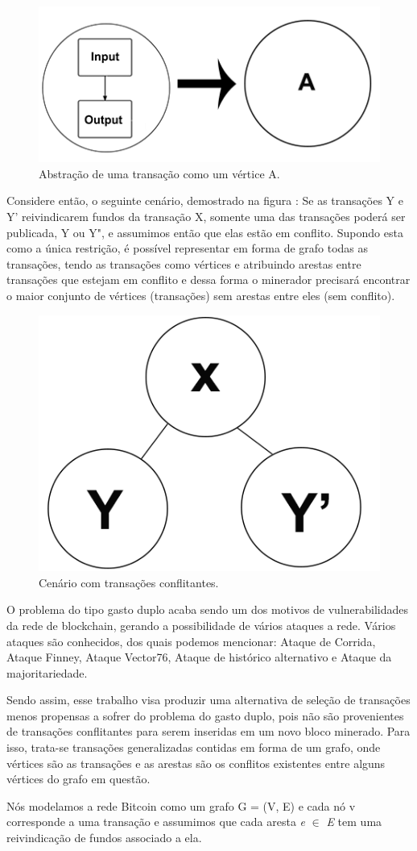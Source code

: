 \documentclass[conference]{IEEEtran}
\begin{document}
\begin{figure}[ht]
\centerline{\includegraphics[width=.2\textwidth]{imgs/Nodo2.png}}
\caption{Abstração de uma transação como um vértice A.}
\label{vertice}
\end{figure}

 Considere então, o seguinte cenário, demostrado na figura : Se as transações Y e Y' reivindicarem fundos da transação X, somente uma das transações poderá ser publicada, Y ou Y", e assumimos então que elas estão em conflito. Supondo esta como a única restrição,  é possível representar em forma de grafo todas as transações, tendo as transações como vértices e  atribuindo arestas entre transações que estejam em conflito e dessa forma o minerador precisará encontrar o maior conjunto de vértices (transações) sem arestas entre eles (sem conflito). 
 
 \begin{figure}[ht]
\centerline{\includegraphics[width=.15\textwidth]{imgs/conflito.png}}
\caption{Cenário com transações conflitantes.}
\label{conflito}
\end{figure}

O problema do tipo gasto duplo acaba sendo um dos motivos de vulnerabilidades da rede de blockchain, gerando a possibilidade de vários ataques a rede. Vários ataques são conhecidos, dos quais podemos mencionar: Ataque de Corrida, Ataque Finney, Ataque Vector76,  Ataque de histórico alternativo e Ataque da majoritariedade.

Sendo assim, esse trabalho visa produzir uma alternativa de seleção de transações menos propensas a sofrer do problema do gasto duplo, pois não são provenientes de transações conflitantes para serem inseridas em um novo bloco minerado. Para isso, trata-se transações generalizadas contidas em forma de um grafo, onde vértices são as transações e as arestas são os conflitos existentes entre alguns vértices do grafo em questão.

Nós modelamos a rede Bitcoin como um grafo G = (V, E) e cada nó v corresponde a uma transação e assumimos que cada aresta \emph{e} $\in$ \emph{E} tem uma reivindicação de fundos associado a ela.
\end{document}
